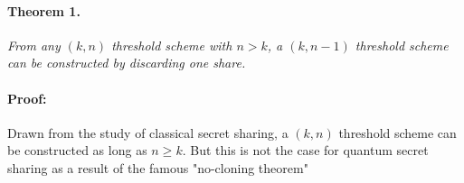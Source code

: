 \documentclass[12pt]{article}
\begin{document}
\paragraph{Theorem 1.}
\textit{From any $(k,n)$ threshold scheme with $n > k$, a $(k, n-1)$ threshold scheme can be constructed by discarding one share.} 
\paragraph{Proof:} Drawn from the study of classical secret sharing, a $(k,n)$ threshold scheme can be constructed as long as $n \ge k$. But this is not the case for quantum secret sharing as a result of the famous "no-cloning theorem"














	





\end{document}

